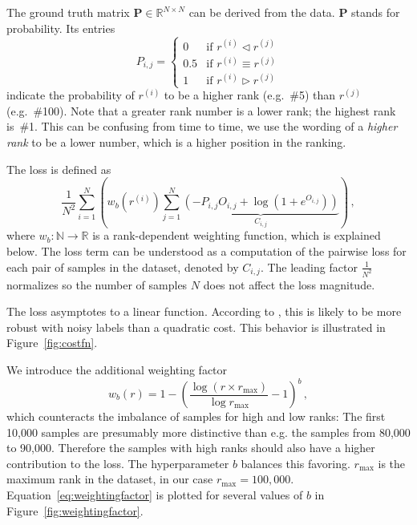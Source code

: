 The ground truth matrix $\bm{P}\in\mathbb{R}^{N\times N}$ can be derived from the data. $\bm{P}$ stands for probability. Its entries\begin{equation}\label{eq:groundtruthmatrix}
    P_{i,j}=\begin{cases}
        0&\text{if }r^{(i)}\triangleleft r^{(j)}\\
        0.5&\text{if }r^{(i)}\equiv r^{(j)}\\
        1&\text{if }r^{(i)}\triangleright r^{(j)}
    \end{cases}
\end{equation}indicate the probability of $r^{(i)}$ to be a higher rank (e.g.~\#5) than $r^{(j)}$ (e.g.~\#100). Note that a greater rank number is a lower rank; the highest rank is~\#1. This can be confusing from time to time, we use the wording of a \textit{higher rank} to be a lower number, which is a higher position in the ranking.

The loss is defined as
\begin{equation}
    \label{eq:loss}
    \frac{1}{N^2}\sum_{i=1}^N\left(
        w_b\left(r^{(i)}\right)\sum_{j=1}^N
            \underbrace{\left(-P_{i,j}O_{i,j}+\log\left(1+e^{O_{i,j}}\right)\right)}_{C_{i,j}}
    \right)\,,
\end{equation}where $w_b:\mathbb{N}\rightarrow\mathbb{R}$ is a rank-dependent weighting function, which is explained below. The loss term can be understood as a computation of the pairwise loss for each pair of samples in the dataset, denoted by $C_{i,j}$. The leading factor $\frac{1}{N^2}$ normalizes so the number of samples $N$ does not affect the loss magnitude.

The loss asymptotes to a linear function. According to \cite{Burges:learningtorankwithsgd}, this is likely to be more robust with noisy labels than a quadratic cost. This behavior is illustrated in Figure~\ref{fig:costfn}.

We introduce the additional weighting factor
\begin{equation}\label{eq:weightingfactor}
    w_b(r)=1-\left(\frac{\log\left(r\times r_\text{max}\right)}{\log r_\text{max}}-1\right)^b\,,
\end{equation}which counteracts the imbalance of samples for high and low ranks: The first 10,000 samples are presumably more distinctive than e.g. the samples from 80,000 to 90,000. Therefore the samples with high ranks should also have a higher contribution to the loss. The hyperparameter $b$ balances this favoring. $r_\text{max}$ is the maximum rank in the dataset, in our case $r_\text{max}=100,000$. Equation~\ref{eq:weightingfactor} is plotted for several values of $b$ in Figure~\ref{fig:weightingfactor}.

